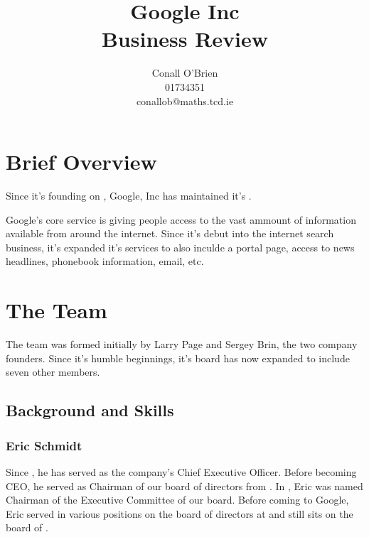 \documentclass[a4paper,12pt]{article}
\begin{document}
\title{Google Inc \\ Business Review}

\author{Conall O'Brien \\ 01734351 \\ conallob@maths.tcd.ie}

\maketitle

\newpage

\doublespacing

\section{Brief Overview}

Since it's founding on \cite[September 7, 1998]{timeline}, Google, Inc
has maintained it's \cite[mission is to organize the world's information
and make it universally accessible and useful]{overview}.


Google's core service is giving people access to the vast ammount of
information available from around the internet. Since it's debut into
the internet search business, it's expanded it's services to also
inculde a portal page, access to news headlines, phonebook information,
email, etc.

\section{The Team}

The team was formed initially by Larry Page and Sergey Brin, the two
company founders. Since it's humble beginnings, it's board has now
expanded to include seven other members.

\subsection{Background and Skills}

\subsubsection{Eric Schmidt} 

Since \cite[July 2001]{board}, he has served as the company's Chief Executive 
Officer. Before becoming CEO, he served as Chairman of our board of 
directors from \cite[March 2001 to April 2004]{board}. In 
\cite[April 2004]{board}, 
Eric was named Chairman of the Executive Committee of our board. 
Before coming to Google, Eric served in various positions on the board
of directors at \cite[Novell and sun Microsystems]{board} and still sits
on the board of \cite[Siebel System]{board}. \cite[Eric has a Bachelor of Science degree
in electrical engineering from Princeton University, and a Masters
degree and Ph.D. in computer science from the University of California
at Berkeley.]{board}
\end{document}
